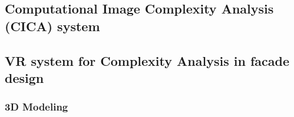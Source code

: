 \documentclass[final,5p,times]{elsarticle}%
\begin{document}
\begin{linenumbers}
    \subsection{Computational Image Complexity Analysis (CICA) system}
    \label{subsec:Computational Image Complexity analysis}
    

    \subsection{VR system for Complexity Analysis in facade design}
    \label{subsec:VRsystemDevelopment}
    

    \subsubsection{3D Modeling}
    \label{subsubsec:3DModeling}
    


\end{linenumbers}
\end{document}
